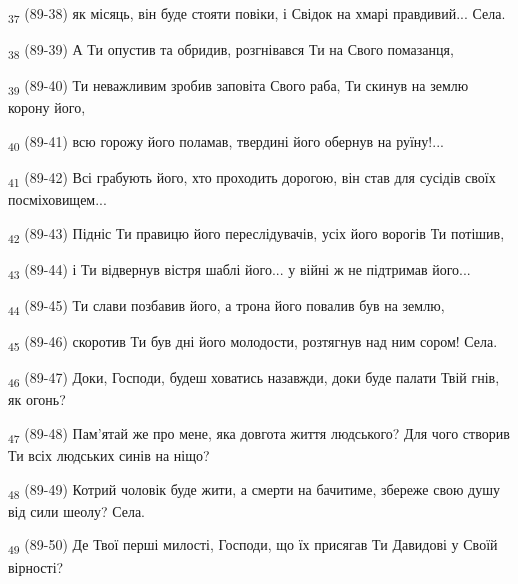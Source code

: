 \begin{tcolorbox}
\textsubscript{37} (89-38) як місяць, він буде стояти повіки, і Свідок на хмарі правдивий... Села.
\end{tcolorbox}
\begin{tcolorbox}
\textsubscript{38} (89-39) А Ти опустив та обридив, розгнівався Ти на Свого помазанця,
\end{tcolorbox}
\begin{tcolorbox}
\textsubscript{39} (89-40) Ти неважливим зробив заповіта Свого раба, Ти скинув на землю корону його,
\end{tcolorbox}
\begin{tcolorbox}
\textsubscript{40} (89-41) всю горожу його поламав, твердині його обернув на руїну!...
\end{tcolorbox}
\begin{tcolorbox}
\textsubscript{41} (89-42) Всі грабують його, хто проходить дорогою, він став для сусідів своїх посміховищем...
\end{tcolorbox}
\begin{tcolorbox}
\textsubscript{42} (89-43) Підніс Ти правицю його переслідувачів, усіх його ворогів Ти потішив,
\end{tcolorbox}
\begin{tcolorbox}
\textsubscript{43} (89-44) і Ти відвернув вістря шаблі його... у війні ж не підтримав його...
\end{tcolorbox}
\begin{tcolorbox}
\textsubscript{44} (89-45) Ти слави позбавив його, а трона його повалив був на землю,
\end{tcolorbox}
\begin{tcolorbox}
\textsubscript{45} (89-46) скоротив Ти був дні його молодости, розтягнув над ним сором! Села.
\end{tcolorbox}
\begin{tcolorbox}
\textsubscript{46} (89-47) Доки, Господи, будеш ховатись назавжди, доки буде палати Твій гнів, як огонь?
\end{tcolorbox}
\begin{tcolorbox}
\textsubscript{47} (89-48) Пам'ятай же про мене, яка довгота життя людського? Для чого створив Ти всіх людських синів на ніщо?
\end{tcolorbox}
\begin{tcolorbox}
\textsubscript{48} (89-49) Котрий чоловік буде жити, а смерти на бачитиме, збереже свою душу від сили шеолу? Села.
\end{tcolorbox}
\begin{tcolorbox}
\textsubscript{49} (89-50) Де Твої перші милості, Господи, що їх присягав Ти Давидові у Своїй вірності?
\end{tcolorbox}
